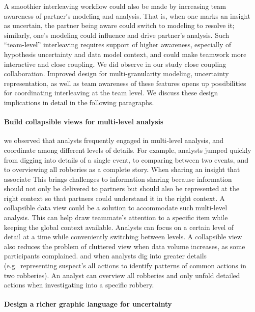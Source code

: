 A smoothier interleaving workflow could also be made by increasing team awareness of partner's modeling and analysis. That is, when one marks an insight as uncertain, the partner being aware could switch to modeling to resolve it; similarly, one's modeling could influence and drive partner's analysis. Such ``team-level'' interleaving requires support of higher awareness, especially of hypothesis uncertainty and data model context, and could make teamwork more interactive and close coupling. We did observe in our study close coupling collaboration. Improved design for multi-granularity modeling, uncertainty representation, as well as team awareness of these features opens up possibilities for coordinating interleaving at the team level. We discuss these design implications in detail in the following paragraphs.

\paragraph{Build collapsible views for multi-level analysis}

we observed that analysts frequently engaged in multi-level analysis, and
coordinate among different levels of details. For example, analysts jumped
quickly from digging into details of a single event, to comparing between two
events, and to overviewing all robberies as a complete story. When sharing an
insight that associate This brings challenges to information sharing because
information should not only be delivered to partners but should also be
represented at the right context so that partners could understand it in the
right context. A collapsible data view could be a solution to accommodate such
multi-level analysis. This can help draw teammate's attention to a specific item
while keeping the global context available. Analysts can focus on a certain
level of detail at a time while conveniently switching between levels. A
collapsible view also reduces the problem of cluttered view when data volume
increases, as some participants complained.  and when analysts dig into greater
details (e.g.~representing suspect's all actions to identify patterns of common
actions in two robberies). An analyst can overview all robberies and only unfold
detailed actions when investigating into a specific robbery.

\paragraph{Design a richer graphic language for uncertainty}

